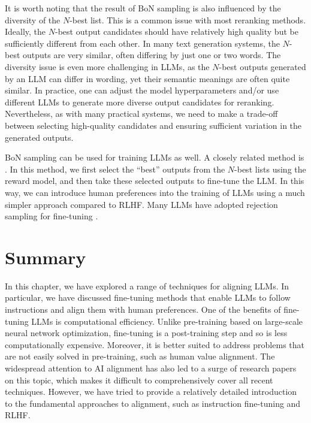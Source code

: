 It is worth noting that the result of BoN sampling is also influenced by the diversity of the $N$-best list. This is a common issue with most reranking methods. Ideally, the $N$-best output candidates should have relatively high quality but be sufficiently different from each other. In many text generation systems, the $N$-best outputs are very similar, often differing by just one or two words. The diversity issue is even more challenging in LLMs, as the $N$-best outputs generated by an LLM can differ in wording, yet their semantic meanings are often quite similar. In practice, one can adjust the model hyperparameters and/or use different LLMs to generate more diverse output candidates for reranking. Nevertheless, as with many practical systems, we need to make a trade-off between selecting high-quality candidates and ensuring sufficient variation in the generated outputs.

BoN sampling can be used for training LLMs as well. A closely related method is . In this method, we first select the ``best'' outputs from the $N$-best lists using the reward model, and then take these selected outputs to fine-tune the LLM. In this way, we can introduce human preferences into the training of LLMs using a much simpler approach compared to RLHF. Many LLMs have adopted rejection sampling for fine-tuning \cite{nakano-etal:2021webgpt,touvron-etal:2023llama2}.


\section{Summary}

In this chapter, we have explored a range of techniques for aligning LLMs. In particular, we have discussed fine-tuning methods that enable LLMs to follow instructions and align them with human preferences. One of the benefits of fine-tuning LLMs is computational efficiency. Unlike pre-training based on large-scale neural network optimization, fine-tuning is a post-training step and so is less computationally expensive. Moreover, it is better suited to address problems that are not easily solved in pre-training, such as human value alignment. The widespread attention to AI alignment has also led to a surge of research papers on this topic, which makes it difficult to comprehensively cover all recent techniques. However, we have tried to provide a relatively detailed introduction to the fundamental approaches to alignment, such as instruction fine-tuning and RLHF.

